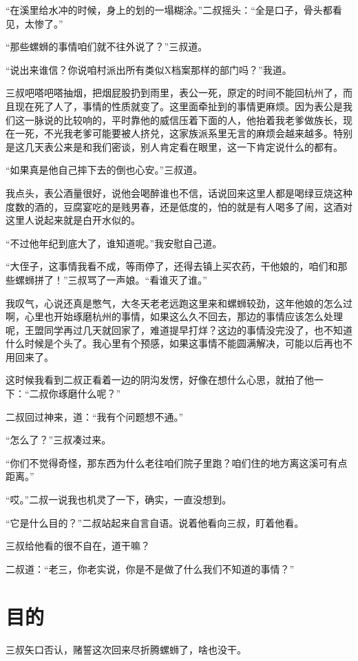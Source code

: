 “在溪里给水冲的时候，身上的划的一塌糊涂。”二叔摇头：“全是口子，骨头都看见，太惨了。”

“那些螺蛳的事情咱们就不往外说了？”三叔道。

“说出来谁信？你说咱村派出所有类似X档案那样的部门吗？”我道。

三叔吧嗒吧嗒抽烟，把烟屁股扔到雨里，表公一死，原定的时间不能回杭州了，而且现在死了人了，事情的性质就变了。这里面牵扯到的事情更麻烦。因为表公是我们这一脉说的比较响的，平时靠他的威信压着下面的人，他抬着我老爹做族长，现在一死，不光我老爹可能要被人挤兑，这家族派系里无言的麻烦会越来越多。特别是这几天表公来是和我们密谈，别人肯定看在眼里，这一下肯定说什么的都有。

“如果真是他自己摔下去的倒也心安。”三叔道。

我点头，表公酒量很好，说他会喝醉谁也不信，话说回来这里人都是喝绿豆烧这种度数的酒的，豆腐宴吃的是贱男春，还是低度的，怕的就是有人喝多了闹，这酒对这里人说起来就是白开水似的。

“不过他年纪到底大了，谁知道呢。”我安慰自己道。

“大侄子，这事情我看不成，等雨停了，还得去镇上买农药，干他娘的，咱们和那些螺蛳拼了！”三叔骂了一声娘。“看谁灭了谁。”

我叹气，心说还真是憋气，大冬天老老远跑这里来和螺蛳较劲，这年他娘的怎么过啊，心里也开始琢磨杭州的事情，如果这么久不回去，那边的事情应该怎么处理呢，王盟同学再过几天就回家了，难道提早打烊？这边的事情没完没了，也不知道什么时候是个头了。我心里有个预感，如果这事情不能圆满解决，可能以后再也不用回来了。

这时候我看到二叔正看着一边的阴沟发愣，好像在想什么心思，就拍了他一下：“二叔你琢磨什么呢？”

二叔回过神来，道：“我有个问题想不通。”

“怎么了？”三叔凑过来。

“你们不觉得奇怪，那东西为什么老往咱们院子里跑？咱们住的地方离这溪可有点距离。”

“哎。”二叔一说我也机灵了一下，确实，一直没想到。

“它是什么目的？”二叔站起来自言自语。说着他看向三叔，盯着他看。

三叔给他看的很不自在，道干嘛？

二叔道：“老三，你老实说，你是不是做了什么我们不知道的事情？”

\chapter{目的}

三叔矢口否认，赌誓这次回来尽折腾螺蛳了，啥也没干。

